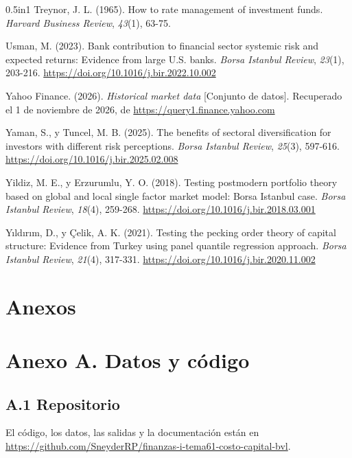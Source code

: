 \documentclass[12pt]{article}
\begin{document}
{\begin{hangparas}{0.5in}{1}
Treynor, J. L. (1965). How to rate management of investment funds. \textit{Harvard Business Review}, \textit{43}(1), 63-75.

Usman, M. (2023). Bank contribution to financial sector systemic risk and expected returns: Evidence from large U.S. banks. \textit{Borsa Istanbul Review}, \textit{23}(1), 203-216. \url{https://doi.org/10.1016/j.bir.2022.10.002}

Yahoo Finance. (2026). \textit{Historical market data} [Conjunto de datos]. Recuperado el 1 de noviembre de 2026, de \url{https://query1.finance.yahoo.com}

Yaman, S., y Tuncel, M. B. (2025). The benefits of sectoral diversification for investors with different risk perceptions. \textit{Borsa Istanbul Review}, \textit{25}(3), 597-616. \url{https://doi.org/10.1016/j.bir.2025.02.008}

Yildiz, M. E., y Erzurumlu, Y. O. (2018). Testing postmodern portfolio theory based on global and local single factor market model: Borsa Istanbul case. \textit{Borsa Istanbul Review}, \textit{18}(4), 259-268. \url{https://doi.org/10.1016/j.bir.2018.03.001}

Yıldırım, D., y Çelik, A. K. (2021). Testing the pecking order theory of capital structure: Evidence from Turkey using panel quantile regression approach. \textit{Borsa Istanbul Review}, \textit{21}(4), 317-331. \url{https://doi.org/10.1016/j.bir.2020.11.002}
\end{hangparas}
}

\newpage
\section{Anexos}
\singlespacing\setlength{\parskip}{3pt}
\section{Anexo A. Datos y código}

\subsection{A.1 Repositorio}
El código, los datos, las salidas y la documentación están en \url{https://github.com/SneyderRP/finanzas-i-tema61-costo-capital-bvl}.
\end{document}
